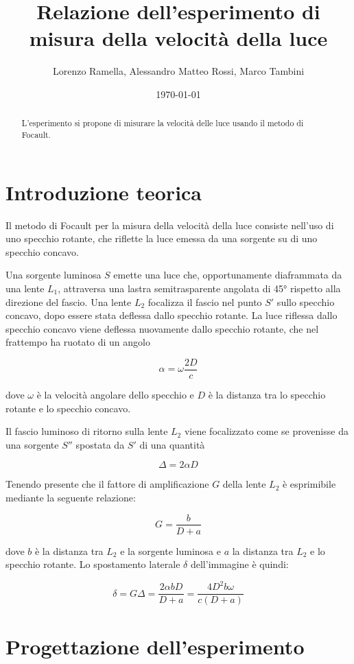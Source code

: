 \documentclass{article}
\title{Relazione dell'esperimento di misura della velocità della luce}
\author{Lorenzo Ramella, Alessandro Matteo Rossi, Marco Tambini}
\date{\today}
\begin{document}
\maketitle

\begin{abstract}
L’esperimento si propone di misurare la velocità delle luce usando il metodo di Focault. 
\end{abstract}
\tableofcontents

\section{Introduzione teorica}
Il metodo di Focault per la misura della velocità della luce consiste nell'uso di uno specchio rotante, che riflette la luce emessa da una sorgente su di uno specchio concavo. 

Una sorgente luminosa $S$ emette una luce che, opportunamente diaframmata da una lente $L_1$, attraversa una lastra semitrasparente angolata di 45° rispetto alla direzione del fascio. Una lente $L_2$ focalizza il fascio nel punto $S'$ sullo specchio concavo, dopo essere stata deflessa dallo specchio rotante. La luce riflessa dallo specchio concavo viene deflessa nuovamente dallo specchio rotante, che nel frattempo ha ruotato di un angolo 

\[\alpha = \omega \frac{2D}{c}\]

dove $\omega$ è la velocità angolare dello specchio e $D$ è la distanza tra lo specchio rotante e lo specchio concavo.

Il fascio luminoso di ritorno sulla lente $L_2$ viene focalizzato come se provenisse da una sorgente $S''$ spostata da $S'$ di una quantità 

\[\Delta = 2 \alpha D\] 

Tenendo presente che il fattore di amplificazione $G$ della lente $L_2$ è esprimibile mediante la seguente relazione:

\[G=\frac{b}{D+a}\]

dove $b$ è la distanza tra $L_2$ e la sorgente luminosa e $a$  la distanza tra $L_2$ e lo specchio rotante. Lo spostamento laterale $\delta$ dell'immagine è quindi:

\[\delta = G\Delta =\frac{2\alpha b D}{D + a}=\frac{4 D^2 b \omega}{c(D+a)}\]

\section{Progettazione dell'esperimento}
\end{document}
